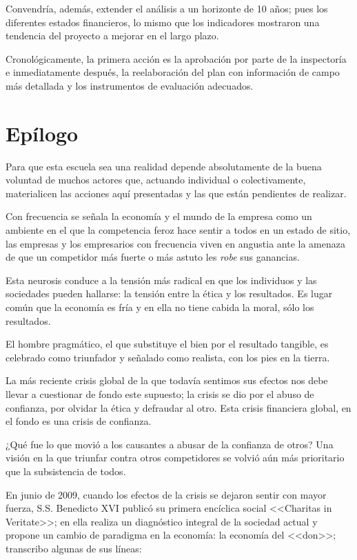 Convendría, además, extender el análisis a un horizonte de 10 años; pues los diferentes estados financieros, lo mismo que los indicadores mostraron una tendencia del proyecto a mejorar en el largo plazo.

Cronológicamente, la primera acción es la aprobación por parte de la inspectoría e inmediatamente después, la reelaboración del plan con información de campo más detallada y los instrumentos de evaluación adecuados.

\section*{Epílogo}

Para que esta escuela sea una realidad depende absolutamente de la buena voluntad de muchos actores que, actuando individual o colectivamente, materialicen las acciones aquí presentadas y las que están pendientes de realizar.

Con frecuencia se señala la economía y el mundo de la empresa como un ambiente en el que la competencia feroz hace sentir a todos en un estado de sitio, las empresas y los empresarios con frecuencia viven en angustia ante la amenaza de que un competidor más fuerte o más astuto les \emph{robe} sus ganancias.

Esta neurosis conduce a la tensión más radical en que los individuos y las sociedades pueden hallarse: la tensión entre la ética y los resultados. Es lugar común que la economía es fría y en ella no tiene cabida la moral, sólo los resultados.

El hombre pragmático, el que substituye el bien por el resultado tangible, es celebrado como triunfador y señalado como realista, con los pies en la tierra.

La más reciente crisis global de la que todavía sentimos sus efectos nos debe llevar a cuestionar de fondo este supuesto; la crisis se dio por el abuso de confianza, por olvidar la ética y defraudar al otro. Esta crisis financiera global, en el fondo es una crisis de confianza.

¿Qué fue lo que movió a los causantes a abusar de la confianza de otros? Una visión en la que triunfar contra otros competidores se volvió aún más prioritario que la subsistencia de todos.

En junio de 2009, cuando los efectos de la crisis se dejaron sentir con mayor fuerza, S.S. Benedicto XVI publicó su primera encíclica social <<Charitas in Veritate>>; en ella realiza un diagnóstico integral de la sociedad actual y propone un cambio de paradigma en la economía: la economía del <<don>>; transcribo algunas de sus líneas:

